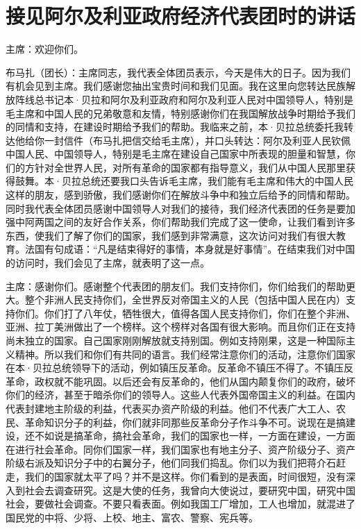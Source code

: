 \section[接见阿尔及利亚政府经济代表团时的讲话（一九六四年九月二十日）]{接见阿尔及利亚政府经济代表团时的讲话}


主席：欢迎你们。

布马扎（团长）：主席同志，我代表全体团员表示，今天是伟大的日子。因为我们有机会见到主席。我们感谢您抽出宝贵时间和我们见面。我在这里向您转达民族解放阵线总书记本·贝拉和阿尔及利亚政府和阿尔及利亚人民对中国领导人，特别是毛主席和中国人民的兄弟敬意和友情，特别感谢你们在我国解放战争时期给予我们的同情和支持，在建设时期给予我们的帮助。我临来之前，本·贝拉总统委托我转达他给你一封信件（布马扎把信交给毛主席），并口头转达：阿尔及利亚人民钦佩中国人民、中国领导人，特别是毛主席在建设自己国家中所表现的胆量和智慧，你们的方针对全世界人民，对所有革命的国家都有指导意义，我们从中国人民那里获得鼓舞。本·贝拉总统还要我口头告诉毛主席，我们能有毛主席和伟大的中国人民这样的朋友，感到骄傲，我们感谢你们在解放斗争中和独立后给予的同情和帮助。同时我代表全体团员感谢中国领导人对我们的接待，我们经济代表团的任务是要加强中阿两国之间的友好合作关系，你们帮助我们完成了这一使命，让我们看到许多东西，使我们了解了你们的国家，我们感到非常满意，这次访问对我们有很大教育。法国有句成语：“凡是结束得好的事情，本身就是好事情”。在结束我们对中国的访问时，我们会见了主席，就表明了这一点。

主席：感谢你们。感谢整个代表团的朋友们。我们支持你们，你们给我们的帮助更大。整个非洲人民支持你们，全世界反对帝国主义的人民（包括中国人民在内）支持你们。你们打了八年仗，牺牲很大，值得各国人民支持你们，你们在整个非洲、亚洲、拉丁美洲做出了一个榜样。这个榜样对各国有很大影响。而且你们正在支持尚未独立的国家。自己国家刚刚解放就支持别国。例如支持刚果，这是一种国际主义精神。所以我们和你们有共同的语言。我们经常注意你们的活动，注意你们国家在本·贝拉总统领导下的活动，例如镇压反革命。反革命不镇压不得了。不镇压反革命，政权就不能巩固。以后还会有反革命的，他们从国内颠复你们的政府，破坏你们的经济，甚至于暗杀你们的领导人。这些人代表外国帝国主义的利益。在国内代表封建地主阶级的利益，代表买办资产阶级的利益。他们不代表广大工人、农民、革命知识分子的利益，你们就非同那些反革命分子作斗争不可。说现在是搞建设，还不如说是搞革命，搞社会革命，我们的国家也一样，一方面在建设，一方面在进行社会革命。同你们国家一样，我们国家也有地主分子、资产阶级分子、资产阶级右派及知识分子中的右翼分子，他们同我们捣乱。你们以为我们把蒋介石赶走，我们的国家就太平了吗？并不是这样。你们看到的是表面，时间很短，没有深入到社会去调查研究。这是大使的任务，我曾向大使说过，要研究中国，研究中国社会，要做社会调查。不要只看表面。例如我国工厂增加，工人也增加，就混进了国民党的中将、少将、上校、地主、富农、警察、宪兵等。

